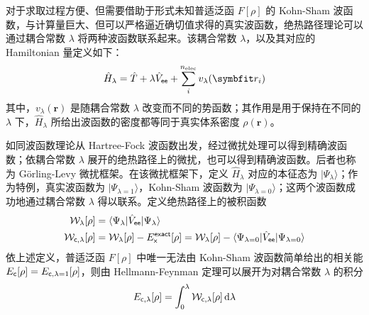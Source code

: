 对于求取过程方便、但需要借助于形式未知普适泛函 $F[\rho]$ 的 Kohn-Sham 波函数，与计算量巨大、但可以严格逼近确切值求得的真实波函数，绝热路径理论可以通过耦合常数 $\lambda$ 将两种波函数联系起来。该耦合常数 $\lambda$，以及其对应的 Hamiltonian 量定义如下：
\begin{equation}
  \label{eq.2.H-lambda-ac}
  \hat H_\lambda = \hat T + \lambda \hat V_\textmt{ee} + \sum_i^{n_\mathrm{elec}} v_{\lambda}(\bm{r}_i)
\end{equation}
其中，$v_{\lambda}(\bm{r})$ 是随耦合常数 $\lambda$ 改变而不同的势函数；其作用是用于保持在不同的 $\lambda$ 下，$\hat H_\lambda$ 所给出波函数的密度都等同于真实体系密度 $\rho(\bm{r})$。

如同波函数理论从 Hartree-Fock 波函数出发，经过微扰处理可以得到精确波函数；依耦合常数 $\lambda$ 展开的绝热路径上的微扰，也可以得到精确波函数。后者也称为 G\"orling-Levy 微扰框架\cite{Goerling-Levy.PRB.1993, Goerling-Levy.PRA.1994}。在该微扰框架下，定义 $\hat H_\lambda$ 对应的本征态为 $| \Psi_\lambda \rangle$；作为特例，真实波函数为 $| \Psi_{\lambda = 1} \rangle$，Kohn-Sham 波函数为 $| \Psi_{\lambda = 0} \rangle$；这两个波函数成功地通过耦合常数 $\lambda$ 得以联系。定义绝热路径上的被积函数
\begin{align}
  \label{eq.2.adiabatic-curve-w}
  \mathcal{W}_{\lambda} [\rho] &= \langle \Psi_\lambda | \hat V_{\textsf{ee}} | \Psi_\lambda \rangle \\
  \mathcal{W}_{\textsf{c}, \lambda} [\rho] &= \mathcal{W}_{\lambda} [\rho] - E_{\textsf{x}}^{\textsf{exact}} [\rho] = \mathcal{W}_{\lambda} [\rho] - \langle \Psi_{\lambda = 0} | \hat V_{\textsf{ee}} | \Psi_{\lambda = 0} \rangle
\end{align}
依上述定义，普适泛函 $F[\rho]$ 中唯一无法由 Kohn-Sham 波函数简单给出的相关能 $E_{\textsf{c}} [\rho] = E_{\textsf{c}, \lambda=1} [\rho]$，则由 Hellmann-Feynman 定理可以展开为对耦合常数 $\lambda$ 的积分
\begin{equation}
  \label{eq.2.Ec-lambda-integral}
  E_{\textsf{c}, \lambda} [\rho] = \int_0^\lambda \mathcal{W}_{\textsf{c}, \lambda} [\rho] \, \mathrm{d} \lambda
\end{equation}

